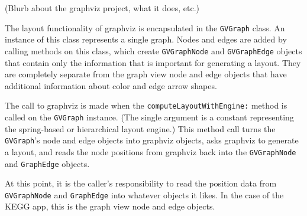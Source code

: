 (Blurb about the graphviz project, what it does, etc.)

The layout functionality of graphviz is encapsulated in the \texttt{GVGraph}
class. An instance of this class represents a single graph. Nodes and edges are
added by calling methods on this class, which create \texttt{GVGraphNode} and
\texttt{GVGraphEdge} objects that contain only the information that is important
for generating a layout. They are completely separate from the graph view node
and edge objects that have additional information about color and edge arrow
shapes.

The call to graphviz is made when the \texttt{computeLayoutWithEngine:} method
is called on the \texttt{GVGraph} instance. (The single argument is a constant
representing the spring-based or hierarchical layout engine.) This method call
turns the \texttt{GVGraph}'s node and edge objects into graphviz objects, asks
graphviz to generate a layout, and reads the node positions from graphviz back
into the \texttt{GVGraphNode} and \texttt{GraphEdge} objects.

At this point, it is the caller's responsibility to read the position data from
\texttt{GVGraphNode} and \texttt{GraphEdge} into whatever objects it likes. In
the case of the KEGG app, this is the graph view node and edge objects.

